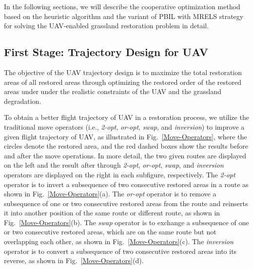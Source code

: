\documentclass[preprint,5pt]{elsarticle}
\begin{document}
In the following sections, we will describe the cooperative optimization method based on the heuristic algorithm and the
variant of PBIL with MRELS strategy for solving the UAV-enabled grassland restoration problem in detail.
\subsection{First Stage: Trajectory Design for UAV}
The objective of the UAV trajectory design is to maximize the total restoration areas of all restored areas through optimizing the restored order of the restored areas under under the realistic constraints of the UAV and the grassland degradation.

To obtain a better flight trajectory of UAV in a restoration process, we utilize the traditional move operators \cite{braysy2005vehicle,liu2021memetic} (i.e., \emph{2-opt}, \emph{or-opt}, \emph{swap}, and \emph{inversion}) to improve a given flight trajectory of UAV, as illustrated in Fig.~\ref{Move-Operators}, where the circles denote the restored area, and the red dashed boxes show the results before and after the move operations. In more detail, the two given routes are displayed on the left and the result after through \emph{2-opt}, \emph{or-opt}, \emph{swap}, and \emph{inversion} operators are displayed on the right in each subfigure, respectively. The \emph{2-opt} operator is to invert a subsequence of two consecutive restored areas in a route as shown in Fig.~\ref{Move-Operators}(a). The \emph{or-opt} operator is to remove a subsequence of one or two consecutive restored areas from the route and reinserts it into another position of the same route or different route, as shown in Fig.~\ref{Move-Operators}(b). The \emph{swap} operator is to exchange a subsequence of one or two consecutive restored areas, which are on the same route but not overlapping each other, as shown in Fig.~\ref{Move-Operators}(c). The \emph{inversion} operator is to convert a subsequence of two consecutive restored areas into its reverse, as shown in Fig.~\ref{Move-Operators}(d).
\end{document}
